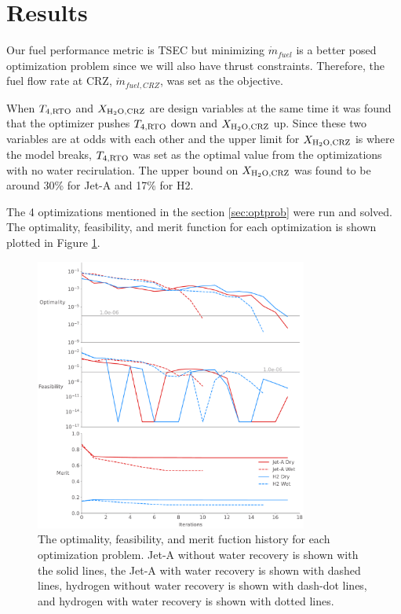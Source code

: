 \documentclass[conf]{new-aiaa}
\begin{document}
\section{Results}
\label{sec:results}

Our fuel performance metric is TSEC but minimizing $\dot{m}_{fuel}$ is a better posed optimization problem since we will also have thrust constraints.
Therefore, the fuel flow rate at CRZ, $\dot{m}_{fuel,CRZ}$, was set as the objective.

When $T_{4,\rm{RTO}}$ and $X_{\rm{H_2O,CRZ}}$ are design variables at the same time it was found that the optimizer pushes $T_{4,\rm{RTO}}$ down and $X_{\rm{H_2O,CRZ}}$ up.
Since these two variables are at odds with each other and the upper limit for $X_{\rm{H_2O,CRZ}}$ is where the model breaks, $T_{4,\rm{RTO}}$ was set as the optimal value from the optimizations with no water recirulation.
The upper bound on $X_{\rm{H_2O,CRZ}}$ was found to be around 30\% for Jet-A and 17\% for H2.

The 4 optimizations mentioned in the section \ref{sec:optprob} were run and solved.
The optimality, feasibility, and merit function for each optimization is shown plotted in Figure \ref{fig:history_summary}.

\begin{figure}[hbt!]
    \centering
    \includegraphics[width=0.8\textwidth]{opt_summary.pdf}
    \caption{The optimality, feasibility, and merit fuction history for each optimization problem.
        Jet-A without water recovery is shown with the solid lines, the Jet-A with water recovery is shown with dashed lines, hydrogen without water recovery is shown with dash-dot lines, and hydrogen with water recovery is shown with dotted lines.}
    \label{fig:history_summary}
\end{figure}
\end{document}
